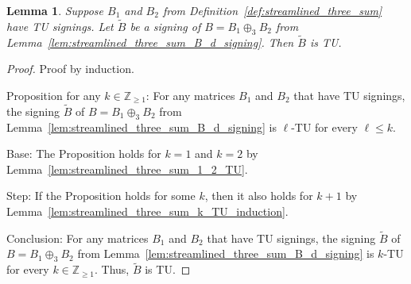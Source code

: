\documentclass{article}
\newtheorem{lemma}{Lemma}
\theoremstyle{definition}
\begin{document}
\begin{lemma}\label{lem:streamlined_three_sum_regular}
    Suppose $B_{1}$ and $B_{2}$ from Definition~\ref{def:streamlined_three_sum} have TU signings. Let $\tilde{B}$ be a signing of $B = B_{1} \oplus_{3} B_{2}$ from Lemma~\ref{lem:streamlined_three_sum_B_d_signing}. Then $\tilde{B}$ is TU.
\end{lemma}

\begin{proof}
    Proof by induction.

    Proposition for any $k \in \mathbb{Z}_{\geq 1}$: For any matrices $B_{1}$ and $B_{2}$ that have TU signings, the signing $\tilde{B}$ of $B = B_{1} \oplus_{3} B_{2}$ from Lemma~\ref{lem:streamlined_three_sum_B_d_signing} is $\ell$-TU for every $\ell \leq k$.

    Base: The Proposition holds for $k = 1$ and $k = 2$ by Lemma~\ref{lem:streamlined_three_sum_1_2_TU}.

    Step: If the Proposition holds for some $k$, then it also holds for $k + 1$ by Lemma~\ref{lem:streamlined_three_sum_k_TU_induction}.

    Conclusion: For any matrices $B_{1}$ and $B_{2}$ that have TU signings, the signing $\tilde{B}$ of $B = B_{1} \oplus_{3} B_{2}$ from Lemma~\ref{lem:streamlined_three_sum_B_d_signing} is $k$-TU for every $k \in \mathbb{Z}_{\geq 1}$. Thus, $\tilde{B}$ is TU.
\end{proof}
\end{document}
